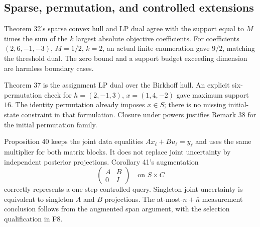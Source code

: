 \documentclass[10pt]{article}
\begin{document}
\subsection*{Sparse, permutation, and controlled extensions}
Theorem 32’s sparse convex hull and LP dual agree with the support equal to \(M\) times the sum of the \(k\) largest absolute objective coefficients. For coefficients \((2,6,-1,-3)\), \(M=1/2\), \(k=2\), an actual finite enumeration gave \(9/2\), matching the threshold dual. The zero bound and a support budget exceeding dimension are harmless boundary cases.\par
Theorem 37 is the assignment LP dual over the Birkhoff hull. An explicit six-permutation check for \(h=(2,-1,3)\), \(x=(1,4,-2)\) gave maximum support \(16\). The identity permutation already imposes \(x\in S\); there is no missing initial-state constraint in that formulation. Closure under powers justifies Remark 38 for the initial permutation family.\par
Proposition 40 keeps the joint data equalities \(Ax_\ell+Bu_\ell=y_\ell\) and uses the same multiplier for both matrix blocks. It does not replace joint uncertainty by independent posterior projections. Corollary 41’s augmentation \[\begin{pmatrix}A&B\\0&I\end{pmatrix}
 \quad\text{on }S\times C\] correctly represents a one-step controlled query. Singleton joint uncertainty is equivalent to singleton \(A\) and \(B\) projections. The at-most-\(n+\bar n\) measurement conclusion follows from the augmented span argument, with the selection qualification in F8.\par
\end{document}
